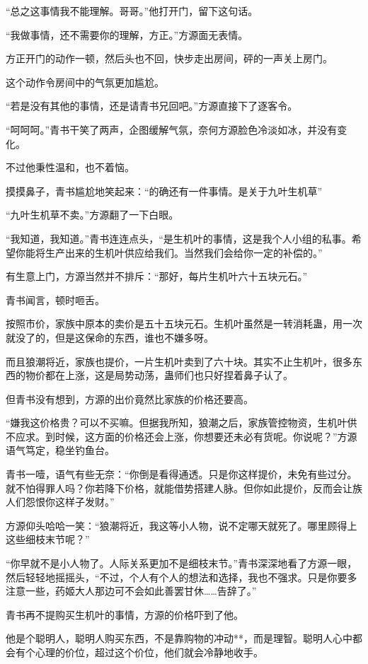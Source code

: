 \begin{this_body}
“总之这事情我不能理解。哥哥。”他打开门，留下这句话。

“我做事情，还不需要你的理解，方正。”方源面无表情。

方正开门的动作一顿，然后头也不回，快步走出房间，砰的一声关上房门。

这个动作令房间中的气氛更加尴尬。

“若是没有其他的事情，还是请青书兄回吧。”方源直接下了逐客令。

“呵呵呵。”青书干笑了两声，企图缓解气氛，奈何方源脸色冷淡如冰，并没有变化。

不过他秉性温和，也不着恼。

摸摸鼻子，青书尴尬地笑起来：“的确还有一件事情。是关于九叶生机草”

“九叶生机草不卖。”方源翻了一下白眼。

“我知道，我知道。”青书连连点头，“是生机叶的事情，这是我个人小组的私事。希望你能将生产出来的生机叶供应给我们。当然我们会给你一定的补偿的。”

有生意上门，方源当然并不排斥：“那好，每片生机叶六十五块元石。”

青书闻言，顿时咂舌。

按照市价，家族中原本的卖价是五十五块元石。生机叶虽然是一转消耗蛊，用一次就没了的，但是这保命的东西，谁也不嫌多呀。

而且狼潮将近，家族也提价，一片生机叶卖到了六十块。其实不止生机叶，很多东西的物价都在上涨，这是局势动荡，蛊师们也只好捏着鼻子认了。

但青书没有想到，方源的出价竟然比家族的价格还要高。

“嫌我这价格贵？可以不买嘛。但据我所知，狼潮之后，家族管控物资，生机叶供不应求。到时候，这方面的价格还会上涨，你想要还未必有货呢。你说呢？”方源语气笃定，稳坐钓鱼台。

青书一噎，语气有些无奈：“你倒是看得通透。只是你这样提价，未免有些过分。就不怕得罪人吗？你若降下价格，就能借势搭建人脉。但你如此提价，反而会让族人们怨恨你这样子发财。”

方源仰头哈哈一笑：“狼潮将近，我这等小人物，说不定哪天就死了。哪里顾得上这些细枝末节呢？”

“你早就不是小人物了。人际关系更加不是细枝末节。”青书深深地看了方源一眼，然后轻轻地摇摇头，“不过，个人有个人的想法和选择，我也不强求。只是你要多注意一些，药姬大人那边可不会如此善罢甘休……告辞了。”

青书再不提购买生机叶的事情，方源的价格吓到了他。

他是个聪明人，聪明人购买东西，不是靠购物的冲动**，而是理智。聪明人心中都会有个心理的价位，超过这个价位，他们就会冷静地收手。


\end{this_body}
